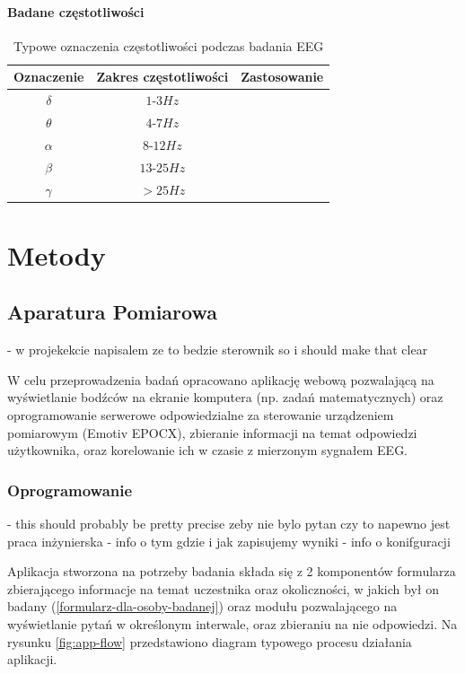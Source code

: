\documentclass{./assets/wfis}
\begin{document}
\subsubsection{Badane częstotliwości}

\begin{table}[h]
    \centering
    \begin{tabular}{|c|c|c|}
        \hline
        Oznaczenie & Zakres częstotliwości & Zastosowanie \\
        \hline
        $\delta$ & $1$-$3Hz$ & \\
        $\theta$ & $4$-$7Hz$ & \\
        $\alpha$ & $8$-$12Hz$ & \\
        $\beta$  & $13$-$25Hz$ & \\
        $\gamma$ & $>25Hz$ & \\
        \hline
    \end{tabular}
    \caption{Typowe oznaczenia częstotliwości podczas badania EEG}
    \label{tab:freqs}
\end{table}
\chapter{Metody}

\section{Aparatura Pomiarowa}\label{aparatura-pomiarowa}

- w projekekcie napisalem ze to bedzie sterownik so i should make that clear

W celu przeprowadzenia badań opracowano aplikację webową pozwalającą na wyświetlanie bodźców na ekranie komputera (np. zadań matematycznych) oraz oprogramowanie serwerowe odpowiedzialne za sterowanie urządzeniem pomiarowym (Emotiv EPOCX), zbieranie informacji na temat odpowiedzi użytkownika, oraz korelowanie ich w czasie z mierzonym sygnałem EEG.

\subsection{Oprogramowanie}
- this should probably be pretty precise zeby nie bylo pytan czy to napewno jest praca inżynierska
- info o tym gdzie i jak zapisujemy wyniki
- info o konifguracji
 
Aplikacja stworzona na potrzeby badania składa się z 2 komponentów formularza zbierającego informacje na temat uczestnika oraz okoliczności, w jakich był on badany (\autoref{formularz-dla-osoby-badanej}) oraz modułu pozwalającego na wyświetlanie pytań w określonym interwale, oraz zbieraniu na nie odpowiedzi. Na rysunku \ref{fig:app-flow} przedstawiono diagram typowego procesu działania aplikacji.
\end{document}
